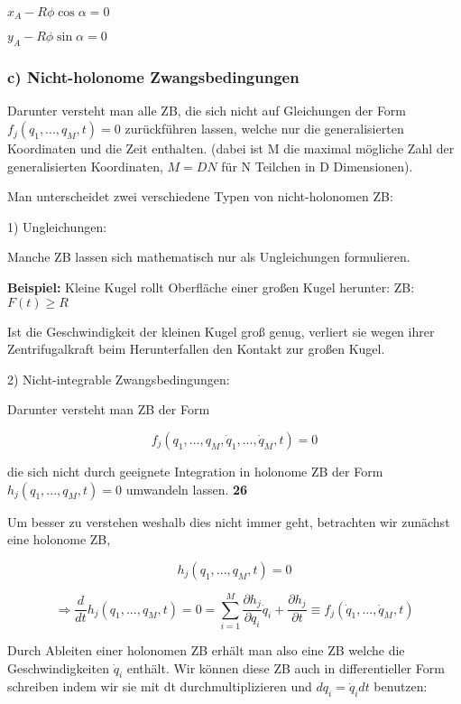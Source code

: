 \documentclass[10pt, letterpaper]{article}
\begin{document}
$x_A - R\phi \cos\alpha = 0$

$y_A - R\phi \sin\alpha = 0$


\subsubsection{c) Nicht-holonome Zwangsbedingungen}

Darunter versteht man alle ZB, die sich nicht auf Gleichungen der Form $f_j(q_1,...,q_M,t)=0$ zurückführen lassen, welche nur die generalisierten Koordinaten und die Zeit enthalten. (dabei ist M die maximal mögliche Zahl der generalisierten Koordinaten, $M=DN$ für N Teilchen in D Dimensionen).

Man unterscheidet zwei verschiedene Typen von nicht-holonomen ZB:

1) Ungleichungen:

Manche ZB lassen sich mathematisch nur als Ungleichungen formulieren.

\textbf{Beispiel:} Kleine Kugel rollt Oberfläche einer großen Kugel herunter:
ZB: $F(t) \geq R$


Ist die Geschwindigkeit der kleinen Kugel groß genug, verliert sie wegen ihrer Zentrifugalkraft beim Herunterfallen den Kontakt zur großen Kugel.

2) Nicht-integrable Zwangsbedingungen:

Darunter versteht man ZB der Form

\[f_j(q_1,...,q_M,\dot{q}_1,...,\dot{q}_M,t) = 0\]

die sich nicht durch geeignete Integration in holonome ZB der Form $h_j(q_1,...,q_M,t)=0$ umwandeln lassen.
\textbf{26}

Um besser zu verstehen weshalb dies nicht immer geht, betrachten wir zunächst eine holonome ZB,

\[h_j(q_1,...,q_M,t) = 0\]

\[\Rightarrow \frac{d}{dt}h_j(q_1,...,q_M,t) = 0 = \sum_{i=1}^M \frac{\partial h_j}{\partial q_i}\dot{q}_i + \frac{\partial h_j}{\partial t} \equiv f_j(\dot{q}_1,...,\dot{q}_M,t)\]

Durch Ableiten einer holonomen ZB erhält man also eine ZB welche die Geschwindigkeiten $\dot{q}_i$ enthält. Wir können diese ZB auch in differentieller Form schreiben indem wir sie mit dt durchmultiplizieren und $dq_i = \dot{q}_i dt$ benutzen:
\end{document}
